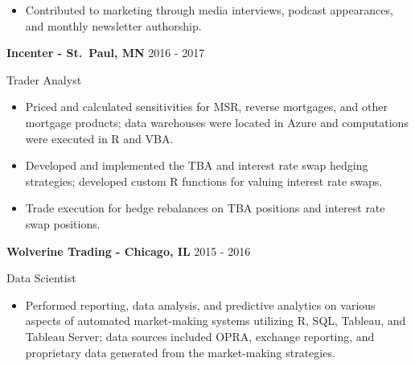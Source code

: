 \documentclass[11pt,a4paper,]{awesome-cv}
\providecommand{\tightlist}{%
	\setlength{\itemsep}{0pt}\setlength{\parskip}{0pt}}
\begin{document}
\begin{itemize}
\tightlist
\item
  Contributed to marketing through media interviews, podcast
  appearances, and monthly newsletter authorship. \vspace{-0.5ex}
\end{itemize}

\normalsize

\vspace{100ex}

\textbf{Incenter - St.~Paul, MN} \hfill 2016 - 2017

\vspace{-1ex}

Trader Analyst

\vspace{-1.5ex}

\small

\begin{itemize}
\item
  Priced and calculated sensitivities for MSR, reverse mortgages, and
  other mortgage products; data warehouses were located in Azure and
  computations were executed in R and VBA. \vspace{-0.5ex}
\item
  Developed and implemented the TBA and interest rate swap hedging
  strategies; developed custom R functions for valuing interest rate
  swaps. \vspace{-0.5ex}
\item
  Trade execution for hedge rebalances on TBA positions and interest
  rate swap positions. \vspace{-0.5ex}
\end{itemize}

\normalsize

\textbf{Wolverine Trading - Chicago, IL} \hfill 2015 - 2016

\vspace{-1ex}

Data Scientist

\vspace{-1.5ex}

\small

\begin{itemize}
\tightlist
\item
  Performed reporting, data analysis, and predictive analytics on
  various aspects of automated market-making systems utilizing R, SQL,
  Tableau, and Tableau Server; data sources included OPRA, exchange
  reporting, and proprietary data generated from the market-making
  strategies. \vspace{-2.25ex}
\end{itemize}
\end{document}
